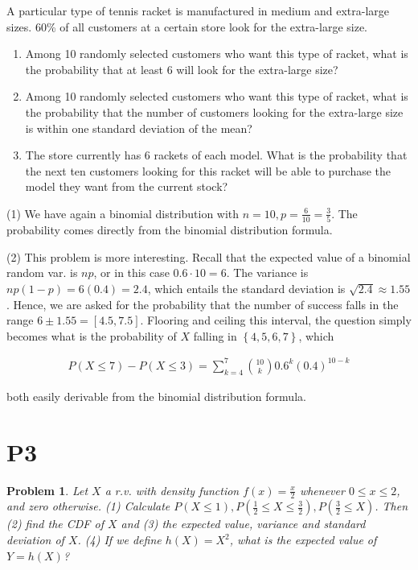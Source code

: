 \documentclass[a4paper, 12pt]{article}
\newtheorem{problem}{Problem}
\newtheorem{problem}{Problem}
\begin{document}
\pagebreak 


A particular type of tennis racket is manufactured in medium and extra-large
sizes. 60\% of all customers at a certain store look for the extra-large size.

\begin{enumerate}
    \item Among 10 randomly selected customers who want this type of racket, what is the probability that at least 6 will look for the extra-large size?
    \item Among 10 randomly selected customers who want this type of racket, what is the probability that the number of customers looking for the extra-large size is within one standard deviation of the mean?
    \item The store currently has 6 rackets of each model. What is the probability that the next ten customers looking for this racket will be able to purchase the model they want from the current stock?
\end{enumerate}

(1) We have again a binomial distribution with $n = 10, p = \frac{6}{10}
= \frac{3}{5}$. The probability comes directly from the binomial distribution
formula.

(2) This problem is more interesting. Recall that the expected value of
a binomial random var. is $np$, or in this case $0.6\cdot 10 = 6$. The variance
is $np(1-p) = 6(0.4) = 2.4$, which entails the standard deviation is
$\sqrt{2.4} \approx 1.55 $. Hence, we are asked for the probability that the
number of success falls in the range $6 \pm 1.55 = [4.5, 7.5]$.
Flooring and ceiling this interval, the question simply becomes 
what is the probability of $X$ falling in $\left\{ 4, 5, 6, 7 \right\} $, 
which  

\begin{align*}
    P(X \leq 7) - P(X \leq 3) = \sum_{k=4}^{7} \binom{10}{k}0.6^k(0.4)^{10 - k}
\end{align*}

both easily derivable from the binomial distribution formula.

\pagebreak 

\section{P3}

\begin{problem}
    Let $X$ a r.v. with density function $f(x) = \frac{x}{2}$ whenever $0 \leq
    x \leq 2$, and zero otherwise. (1) Calculate $P(X\leq 1), P(\frac{1}{2}
    \leq X \leq \frac{3}{2}), P(\frac{3}{2} \leq X)$. Then (2) find the 
    CDF of $X$ and (3) the expected value, variance and standard deviation 
    of $X$. (4) If we define $h(X) = X^2$, what is the expected value of 
    $Y  = h(X)$?
\end{problem}
\end{document}
